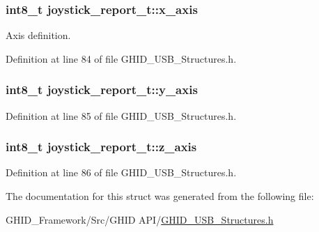 \hypertarget{structjoystick__report__t_a00eddcf4aba7402e3f0fdd1e7ab09d13}{
\subsubsection[{x\-\_\-axis}]{\setlength{\rightskip}{0pt plus 5cm}int8\-\_\-t {\bf joystick\-\_\-report\-\_\-t\-::x\-\_\-axis}}}\label{structjoystick__report__t_a00eddcf4aba7402e3f0fdd1e7ab09d13}


\-Axis definition. 



\-Definition at line 84 of file \-G\-H\-I\-D\-\_\-\-U\-S\-B\-\_\-\-Structures.\-h.

\hypertarget{structjoystick__report__t_a6abec4aa980f7c029aaaa216c448e7af}{
\subsubsection[{y\-\_\-axis}]{\setlength{\rightskip}{0pt plus 5cm}int8\-\_\-t {\bf joystick\-\_\-report\-\_\-t\-::y\-\_\-axis}}}\label{structjoystick__report__t_a6abec4aa980f7c029aaaa216c448e7af}


\-Definition at line 85 of file \-G\-H\-I\-D\-\_\-\-U\-S\-B\-\_\-\-Structures.\-h.

\hypertarget{structjoystick__report__t_ab213b4d95036f350509ba4e4f056ca97}{
\subsubsection[{z\-\_\-axis}]{\setlength{\rightskip}{0pt plus 5cm}int8\-\_\-t {\bf joystick\-\_\-report\-\_\-t\-::z\-\_\-axis}}}\label{structjoystick__report__t_ab213b4d95036f350509ba4e4f056ca97}


\-Definition at line 86 of file \-G\-H\-I\-D\-\_\-\-U\-S\-B\-\_\-\-Structures.\-h.



\-The documentation for this struct was generated from the following file\-:\begin{DoxyCompactItemize}
\item 
\-G\-H\-I\-D\-\_\-\-Framework/\-Src/\-G\-H\-I\-D A\-P\-I/\hyperlink{_g_h_i_d___u_s_b___structures_8h}{\-G\-H\-I\-D\-\_\-\-U\-S\-B\-\_\-\-Structures.\-h}\end{DoxyCompactItemize}
